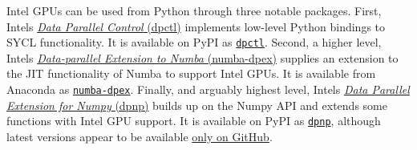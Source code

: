 Intel GPUs can be used from Python through three notable packages. First, Intel\textquotesingle s \href{https://github.com/IntelPython/dpctl}{\emph{Data Parallel Control} (dpctl)} implements low-level Python bindings to SYCL functionality. It is available on PyPI as \href{https://pypi.org/project/dpctl/}{\texttt{dpctl}}. Second, a higher level, Intel\textquotesingle s \href{https://github.com/IntelPython/numba-dpex}{\emph{Data-parallel Extension to Numba} (numba-dpex)} supplies an extension to the JIT functionality of Numba to support Intel GPUs. It is available from Anaconda as \href{https://anaconda.org/intel/numba-dpex}{\texttt{numba-dpex}}. Finally, and arguably highest level, Intel\textquotesingle s \href{https://github.com/IntelPython/dpnp}{\emph{Data Parallel Extension for Numpy} (dpnp)} builds up on the Numpy API and extends some functions with Intel GPU support. It is available on PyPI as \href{https://pypi.org/project/dpnp/}{\texttt{dpnp}}, although latest versions appear to be available \href{https://github.com/IntelPython/dpnp/releases}{only on GitHub}.   

